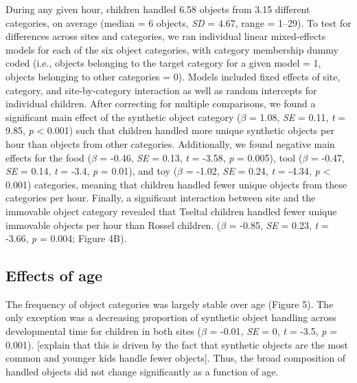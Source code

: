 \documentclass[10pt, letterpaper]{article}
\begin{document}
During any given hour, children handled 6.58 objects from 3.15 different
categories, on average (median = 6 objects, \emph{SD} = 4.67, range =
1--29). To test for differences across sites and categories, we ran
individual linear mixed-effects models for each of the six object
categories, with category membership dummy coded (i.e., objects
belonging to the target category for a given model = 1, objects
belonging to other categories = 0). Models included fixed effects of
site, category, and site-by-category interaction as well as random
intercepts for individual children. After correcting for multiple
comparisons, we found a significant main effect of the synthetic object
category (\(\beta\) = 1.08, \emph{SE} = 0.11, \emph{t} = 9.85, \emph{p}
\textless{} 0.001) such that children handled more unique synthetic
objects per hour than objects from other categories. Additionally, we
found negative main effects for the food (\(\beta\) = -0.46, \emph{SE} =
0.13, \emph{t} = -3.58, \emph{p} = 0.005), tool (\(\beta\) = -0.47,
\emph{SE} = 0.14, \emph{t} = -3.4, \emph{p} = 0.01), and toy (\(\beta\)
= -1.02, \emph{SE} = 0.24, \emph{t} = -4.34, \emph{p} \textless{} 0.001)
categories, meaning that children handled fewer unique objects from
these categories per hour. Finally, a significant interaction between
site and the immovable object category revealed that Tseltal children
handled fewer unique immovable objects per hour than Rossel children.
(\(\beta\) = -0.85, \emph{SE} = 0.23, \emph{t} = -3.66, \emph{p} =
0.004; Figure 4B).

\hypertarget{effects-of-age}{%
\subsection{Effects of age}\label{effects-of-age}}

The frequency of object categories was largely stable over age (Figure
5). The only exception was a decreasing proportion of synthetic object
handling across developmental time for children in both sites (\(\beta\)
= -0.01, \emph{SE} = 0, \emph{t} = -3.5, \emph{p} = 0.001). {[}explain
that this is driven by the fact that synthetic objects are the most
common and younger kids handle fewer objects{]}. Thus, the broad
composition of handled objects did not change significantly as a
function of age.
\end{document}
